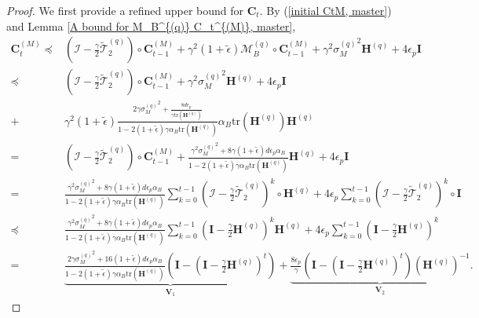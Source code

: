 \documentclass[11pt, letterpaper]{article}
\begin{document}
\begin{proof}
    We first provide a refined upper bound for $\mathbf{C}_t$. 
    By (\ref{initial CtM, master}) and Lemma \ref{A bound for M_B^{(q)} C_t^{(M)}, master},
    \begin{equation}
        \label{eq: f17}
        \begin{aligned}
            \mathbf{C}_t^{(M)}\preceq&(\mathcal{I}-\frac{\gamma}{2}\widetilde{\mathcal{T}}_2^{(q)})\circ \mathbf{C}_{t-1}^{(M)}+\gamma^2(1+\tilde{\epsilon})\mathcal{M}_B^{(q)}\circ \mathbf{C}_{t-1}^{(M)}
            +\gamma^2{\sigma_M^{(q)}}^2\mathbf{H}^{(q)}+4\epsilon_p\mathbf{I}\\
            \preceq&(\mathcal{I}-\frac{\gamma}{2}\widetilde{\mathcal{T}}_2^{(q)})\circ \mathbf{C}_{t-1}^{(M)}
            +\gamma^2{\sigma_M^{(q)}}^2\mathbf{H}^{(q)}+4\epsilon_p\mathbf{I}\\
            +&\gamma^2(1+\tilde{\epsilon})\frac{2\gamma{\sigma_M^{(q)}}^2+\frac{8d\epsilon_p}{\gamma\mathrm{tr}(\mathbf{H}^{(q)})}}{1-2(1+\tilde{\epsilon})\gamma\alpha_B\mathrm{tr}(\mathbf{H}^{(q)})}\alpha_B\mathrm{tr}(\mathbf{H}^{(q)})\mathbf{H}^{(q)}\\
            =&(\mathcal{I}-\frac{\gamma}{2}\widetilde{\mathcal{T}}_2^{(q)})\circ \mathbf{C}_{t-1}^{(M)}+\frac{\gamma^2{\sigma_M^{(q)}}^2+8\gamma(1+\tilde{\epsilon}){d\epsilon_p}\alpha_B}{1-2(1+\tilde{\epsilon})\gamma\alpha_B\mathrm{tr}(\mathbf{H}^{(q)})}\mathbf{H}^{(q)}+4\epsilon_p\mathbf{I}\\
            =&\frac{\gamma^2{\sigma_M^{(q)}}^2+8\gamma(1+\tilde{\epsilon}){d\epsilon_p}\alpha_B}{1-2(1+\tilde{\epsilon})\gamma\alpha_B\mathrm{tr}(\mathbf{H}^{(q)})}\sum_{k=0}^{t-1}(\mathcal{I}-\frac{\gamma}{2}\widetilde{\mathcal{T}}_2^{(q)})^k\circ\mathbf{H}^{(q)}+4\epsilon_p\sum_{k=0}^{t-1}(\mathcal{I}-\frac{\gamma}{2}\widetilde{\mathcal{T}}_2^{(q)})^k\circ\mathbf{I}\\
            \preceq&\frac{\gamma^2{\sigma_M^{(q)}}^2+8\gamma(1+\tilde{\epsilon}){d\epsilon_p}\alpha_B}{1-2(1+\tilde{\epsilon})\gamma\alpha_B\mathrm{tr}(\mathbf{H}^{(q)})}\sum_{k=0}^{t-1}(\mathbf{I}-\frac{\gamma}{2} \mathbf{H}^{(q)})^{k}\mathbf{H}^{(q)}+4\epsilon_p\sum_{k=0}^{t-1}(\mathbf{I}-\frac{\gamma}{2} \mathbf{H}^{(q)})^{k}\\
            =&\underbrace{\frac{2\gamma{\sigma_M^{(q)}}^2+16(1+\tilde{\epsilon}){d\epsilon_p}\alpha_B}{1-2(1+\tilde{\epsilon})\gamma\alpha_B\mathrm{tr}(\mathbf{H}^{(q)})}(\mathbf{I}-(\mathbf{I}-\frac{\gamma}{2} \mathbf{H}^{(q)})^{t})}_{\mathbf{V}_1}+\underbrace{\frac{8\epsilon_p}{\gamma}(\mathbf{I}-(\mathbf{I}-\frac{\gamma}{2} \mathbf{H}^{(q)})^{t})(\mathbf{H}^{(q)})^{-1}}_{\mathbf{V}_2}.
        \end{aligned}
    \end{equation}


\end{proof}
\end{document}

